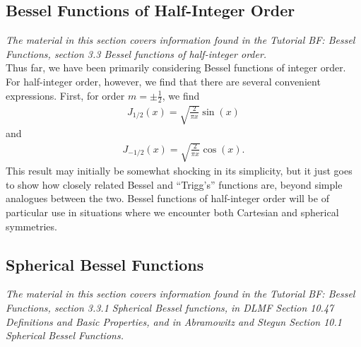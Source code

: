 \documentclass[11pt]{report}
\begin{document}
\subsection{Bessel Functions of Half-Integer Order}

\emph{The material in this section covers information found in the Tutorial BF: Bessel Functions, section 3.3 Bessel functions of half-integer order.}\\

Thus far, we have been primarily considering Bessel functions of integer order. For half-integer order, however, we find that there are several convenient expressions. First, for order $m=\pm\frac{1}{2}$, we find
    \begin{align}
        J_{1/2}(x) = \sqrt{\frac{2}{\pi x}}\sin{(x)}
    \end{align}
and
    \begin{align}
        J_{-1/2}(x) = \sqrt{\frac{2}{\pi x}}\cos{(x)}.
    \end{align}
This result may initially be somewhat shocking in its simplicity, but it just goes to show how closely related Bessel and ``Trigg's'' functions are, beyond simple analogues between the two. Bessel functions of half-integer order will be of particular use in situations where we encounter both Cartesian and spherical symmetries. 

\subsection{Spherical Bessel Functions}

\emph{The material in this section covers information found in the Tutorial BF: Bessel Functions, section 3.3.1 Spherical Bessel functions, in DLMF Section 10.47 Definitions and Basic Properties, and in Abramowitz and Stegun Section 10.1 Spherical Bessel Functions.}\\
\end{document}
